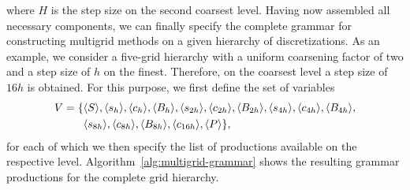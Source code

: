 where $H$ is the step size on the second coarsest level.
Having now assembled all necessary components, we can finally specify the complete grammar for constructing multigrid methods on a given hierarchy of discretizations.
As an example, we consider a five-grid hierarchy with a uniform coarsening factor of two and a step size of $h$ on the finest.
Therefore, on the coarsest level a step size of $16h$ is obtained.
For this purpose, we first define the set of variables 
\begin{align*}
	V = \{ & \langle S \rangle, \langle s_h \rangle, \langle c_h \rangle, \langle B_h \rangle, \langle s_{2h} \rangle, \langle c_{2h} \rangle, \langle B_{2h} \rangle, \langle s_{4h} \rangle, \langle c_{4h} \rangle, \langle B_{4h} \rangle, \\
	& \langle s_{8h} \rangle, \langle c_{8h} \rangle, \langle B_{8h} \rangle, \langle c_{16h} \rangle, \langle P \rangle \},
\end{align*}
for each of which we then specify the list of productions available on the respective level. 
Algorithm~\ref{alg:multigrid-grammar} shows the resulting grammar productions for the complete grid hierarchy.
